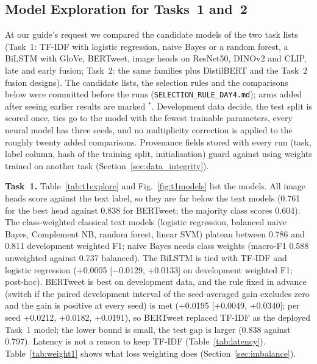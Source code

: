 \documentclass[conference]{IEEEtran}
\begin{document}

\subsection{Model Exploration for Tasks~1 and~2}
\label{sec:explore}
At our guide's request we compared the candidate models of the two task lists (Task~1: TF-IDF with logistic regression, naive Bayes or a random forest, a BiLSTM with GloVe, BERTweet, image heads on ResNet50, DINOv2 and CLIP, late and early fusion; Task~2: the same families plus DistilBERT and the Task~2 fusion designs). The candidate lists, the selection rules and the comparisons below were committed before the runs
(\texttt{SELECTION\_RULE\_DAY4.md}); arms added after seeing earlier results are marked $^\ast$. Development data decide, the test split is scored once, ties go to the model with the fewest trainable parameters, every neural model has three seeds, and no multiplicity correction is applied to the roughly twenty added comparisons.
Provenance fields stored with every run (task, label column, hash of the training split, initialisation) guard against using weights trained on another task (Section~\ref{sec:data_integrity}).

\textbf{Task~1.} Table~\ref{tab:t1explore} and Fig.~\ref{fig:t1models} list the models. All image heads score against the text label, so they are far below the text models (0.761 for the best head against 0.838 for BERTweet; the majority class scores 0.604). The class-weighted classical text models (logistic regression, balanced naive Bayes, Complement NB, random forest, linear SVM) plateau between 0.786 and 0.811 development weighted F1; naive Bayes needs class weights
(macro-F1 0.588 unweighted against 0.737 balanced). The BiLSTM is tied with TF-IDF and logistic regression (+0.0005 [$-$0.0129, +0.0133] on development weighted F1; post-hoc). BERTweet is best on development data, and the rule fixed in advance (switch if the paired development interval of the seed-averaged gain excludes zero and the gain is positive at every seed) is met
(+0.0195 [+0.0049, +0.0340]; per seed +0.0212, +0.0182, +0.0191), so BERTweet replaced TF-IDF as the deployed Task~1 model; the lower bound is small, the test gap is larger (0.838 against 0.797). Latency is not a reason to keep TF-IDF (Table~\ref{tab:latency}).
Table~\ref{tab:weight1} shows what loss weighting does (Section~\ref{sec:imbalance}).
\end{document}
